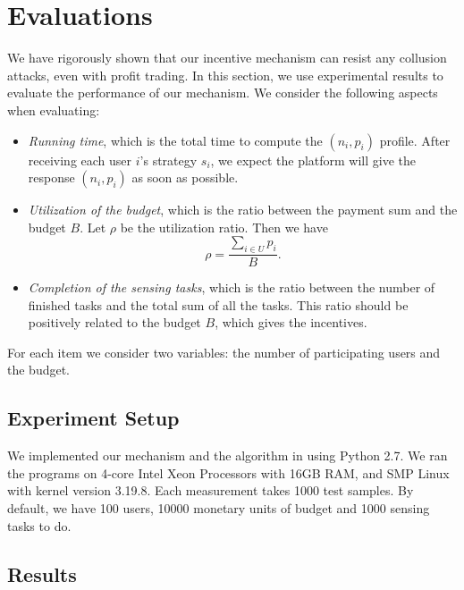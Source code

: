 \documentclass[conference]{IEEEtran}
\theoremstyle{definition}
\begin{document}
{\color{blue}
\section{Evaluations}
\label{sec:sim}
We have rigorously shown that our incentive mechanism can resist any collusion attacks, even with profit trading. In this section, we use experimental results to evaluate the performance of our mechanism. We consider the following aspects when evaluating: 
\begin{itemize}
\item \emph{Running time}, which is the total time to compute the $(n_i,p_i)$ profile. After receiving each user $i$'s strategy $s_i$, we expect the platform will give the response $(n_i,p_i)$ as soon as possible.
\item \emph{Utilization of the budget}, which is the ratio between the payment sum and the budget $B$. Let $\rho$ be the utilization ratio. Then we have
\begin{equation}
\label{eqn:ur}
\rho = \frac{\sum_{i\in U}p_i}{B}.
\end{equation}
\item \emph{Completion of the sensing tasks}, which is the ratio between the number of finished tasks and the total sum of all the tasks. This ratio should be positively related to the budget $B$, which gives the incentives.
\end{itemize}
For each item we consider two variables: the number of participating users and the budget.

\subsection{Experiment Setup}
We implemented our mechanism and the algorithm in \cite{koutsopoulos2013optimal} using Python 2.7. We ran the programs on 4-core Intel Xeon Processors with 16GB RAM, and SMP Linux with kernel version 3.19.8. Each measurement takes 1000 test samples. By default, we have 100 users, 10000 monetary units of budget and 1000 sensing tasks to do.

\subsection{Results}

}
\end{document}
